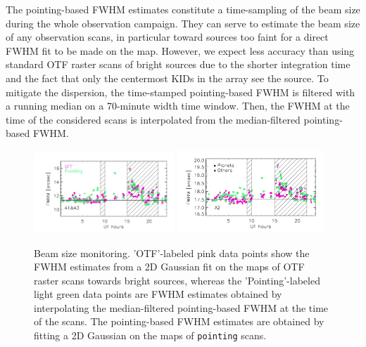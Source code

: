 The pointing-based FWHM estimates constitute a time-sampling of the
beam size during the whole observation campaign. They can serve to
estimate the beam size of any observation scans, in particular
toward sources too faint for a direct FWHM %
fit to be made on the map. However, we
expect less accuracy than using standard OTF raster
scans of bright sources due to the shorter integration time and the
fact that only the centermost KIDs in the array see the source.
To mitigate the dispersion, the time-stamped
pointing-based FWHM
is filtered with a running median on a 70-minute
width time window. Then, the FWHM %
at the time of the considered scans is
interpolated from the median-filtered pointing-based FWHM.%
%
\begin{figure}[ht!]
  \begin{center}
    \includegraphics[clip=true, trim={0.9cm, 0.5cm, 0.5cm, 0.5cm}, width=0.4725\textwidth]{Figures/Beam_monitoring_with_otfs_vs_ut_compare_pointings_1mm.pdf}
    \includegraphics[clip=true, trim={0.5cm, 0.5cm, 0.5cm, 0.5cm}, width=0.4875\textwidth]{Figures/Beam_monitoring_with_otfs_vs_ut_compare_pointings_a2.pdf}
    \caption[Beam size monitoring comparison]{Beam size monitoring.
     'OTF'-labeled pink data points show the FWHM estimates from a 2D
    Gaussian fit on the maps of OTF raster scans towards bright
    sources, whereas the 'Pointing'-labeled light green data points
    are FWHM estimates obtained by interpolating the {\lp
    median-filtered} pointing-based FWHM at the time of the
    scans. {\lp The
    pointing-based FWHM estimates are obtained by fitting a 2D Gaussian on the
    maps of {\tt pointing} scans.}}
\label{fig:beam_monitoring_compare}
\end{center}
\end{figure}
